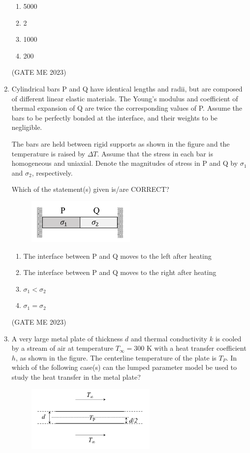 \documentclass[journal]{IEEEtran}
\begin{document}
\begin{enumerate}
\begin{enumerate}
    \item 5000
    \item 2
    \item 1000
    \item 200
\end{enumerate}
\hfill (GATE ME 2023)

\item Cylindrical bars P and Q have identical lengths and radii, but are composed of different linear elastic materials. The Young’s modulus and coefficient of thermal expansion of Q are twice the corresponding values of P. Assume the bars to be perfectly bonded at the interface, and their weights to be negligible. 

The bars are held between rigid supports as shown in the figure and the temperature is raised by $\Delta T$. Assume that the stress in each bar is homogeneous and uniaxial. Denote the magnitudes of stress in P and Q by $\sigma_1$ and $\sigma_2$, respectively.

Which of the statement(s) given is/are CORRECT?
\begin{figure}[H]
\centering
\includegraphics[width=0.5\textwidth]{Fig 44.png}
\caption{}
\label{fig:question46}
\end{figure}

\begin{enumerate}
    \item The interface between P and Q moves to the left after heating
    \item The interface between P and Q moves to the right after heating
    \item $ \sigma_1 < \sigma_2 $
    \item $ \sigma_1 = \sigma_2 $
\end{enumerate}
\hfill (GATE ME 2023)

\item A very large metal plate of thickness $ d $ and thermal conductivity $ k $ is cooled by a stream of air at temperature $ T_\infty = 300 $ K with a heat transfer coefficient $ h $, as shown in the figure. The centerline temperature of the plate is $ T_P $. In which of the following case(s) can the lumped parameter model be used to study the heat transfer in the metal plate?
\begin{figure}[H]
\centering
\includegraphics[width=0.6\textwidth]{Fig 45.png}
\caption{}
\label{fig:question47}
\end{figure}


\end{enumerate}
\end{document}
